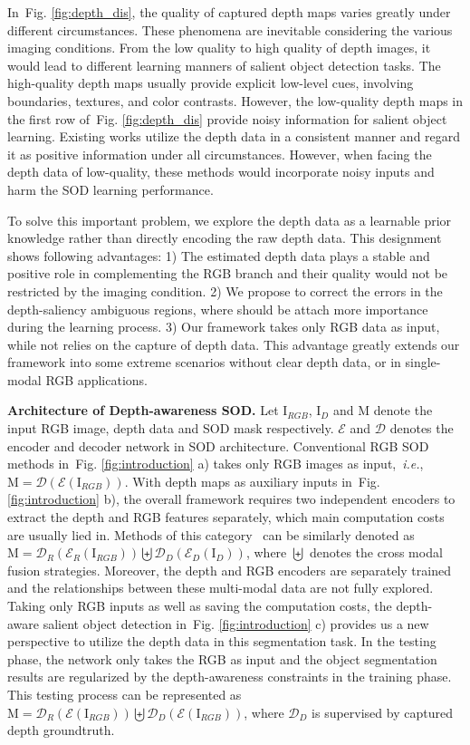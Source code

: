 \documentclass[journal]{IEEEtran}
\def\ie{{\em i.e.}}
\newcommand{\figref}[1]{Fig. \ref{#1}}
\newcommand{\mc}[1]{\mathcal{#1}}
\newcommand{\br}[1]{\bm{\mathrm{#1}}}
\begin{document}
In~\figref{fig:depth_dis}, the quality of captured depth maps varies greatly under different circumstances. These phenomena are inevitable considering the various imaging conditions. From the low quality to high quality of depth images, it would lead to different learning manners of salient object detection tasks. The high-quality depth maps usually provide explicit low-level cues, involving boundaries, textures, and color contrasts. However, the low-quality depth maps in the first row of~\figref{fig:depth_dis} provide noisy information for salient object learning. Existing works utilize the depth data in a consistent manner and regard it as positive information under all circumstances. However, when facing the depth data of low-quality, these methods would incorporate noisy inputs and harm the SOD learning performance.

To solve this important problem, we explore the depth data as a learnable prior knowledge rather than directly encoding the raw depth data. This designment shows following advantages:
 1) The estimated depth data plays a stable and positive role in complementing the RGB branch and their quality would not be restricted by the imaging condition.
2) We propose to correct the errors in the depth-saliency ambiguous regions, where should be attach more importance during the learning process.
3) Our framework takes only RGB data as input, while not relies on the capture of depth data. This advantage greatly extends our framework into some extreme scenarios without clear depth data, or in single-modal RGB applications.


\textbf{Architecture of Depth-awareness SOD.} Let $\br{I}_{RGB}$, $\br{I}_{D}$ and $\br{M}$ denote the input RGB image, depth data and SOD mask respectively. $\mc{E}$ and $\mc{D}$ denotes the encoder and decoder network in SOD architecture.  Conventional RGB SOD methods in~\figref{fig:introduction} a) takes only RGB images as input,~\ie, $\br{M}=\mc{D}(\mc{E}(\br{I}_{RGB}))$. With depth maps as auxiliary inputs in~\figref{fig:introduction} b), the overall framework requires two independent encoders to extract the depth and RGB features separately, which main computation costs are usually lied in. Methods of this category~\cite{fan2020bbs,liu2020learning} can be similarly denoted as $\br{M}=\mc{D}_R(\mc{E}_{R}(\br{I}_{RGB})) \biguplus \mc{D}_D(\mc{E}_{D}(\br{I}_{D}))$, where $\biguplus$ denotes the cross modal fusion strategies.
Moreover, the depth and RGB encoders are separately trained and the relationships between these multi-modal data are not fully explored.
Taking only RGB inputs as well as saving the computation costs, the depth-aware salient object detection in~\figref{fig:introduction} c) provides us a new perspective to utilize the depth data in this segmentation task. In the testing phase, the network only takes the RGB as input and the object segmentation results are regularized by the depth-awareness constraints in the training phase. This testing process can be represented as $\br{M}=\mc{D}_R(\mc{E}(\br{I}_{RGB})) \biguplus \mc{D}_D(\mc{E}(\br{I}_{RGB}))$, where $\mc{D}_D$ is supervised by captured depth groundtruth.
\end{document}
